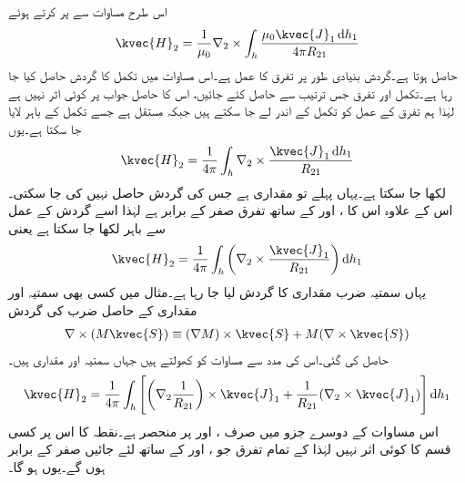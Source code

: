 اس طرح مساوات  سے  پر کرتے ہوئے
\begin{align*}
\kvec{H}_2=\frac{1}{\mu_0} \nabla_2 \times \int_h \frac{\mu_0 \kvec{J}_1 \dif h_1}{4\pi R_{21}}
\end{align*}
حاصل ہوتا ہے۔گردش  بنیادی طور پر تفرق کا عمل ہے۔اس مساوات میں تکمل کا گردش حاصل کیا جا رہا ہے۔تکمل اور تفرق جس ترتیب سے حاصل کئے جائیں، اس کا حاصل جواب پر کوئی اثر نہیں ہے لہٰذا ہم تفرق کے عمل کو تکمل کے اندر لے جا سکتے ہیں جبکہ  مستقل ہے جسے تکمل کے باہر لایا جا سکتا ہے۔یوں
\begin{align*}
\kvec{H}_2=\frac{1}{4\pi}  \int_h \nabla_2 \times\frac{ \kvec{J}_1 \dif h_1}{ R_{21}}
\end{align*}
لکھا جا سکتا ہے۔یہاں  پہلے تو مقداری ہے جس کی گردش حاصل نہیں کی جا سکتی۔ اس کے علاوہ اس کا ،  اور  کے ساتھ تفرق صفر کے برابر ہے لہٰذا اسے گردش کے عمل سے  باہر لکھا جا سکتا ہے یعنی
\begin{align}\label{مساوات_مقناطیسی_گردش_ثبوت_الف}
\kvec{H}_2=\frac{1}{4\pi}  \int_h \left(\nabla_2 \times\frac{ \kvec{J}_1}{ R_{21}}\right) \dif h_1
\end{align}
یہاں سمتیہ  ضرب مقداری  کا گردش لیا جا رہا ہے۔مثال  میں کسی بھی سمتیہ  اور مقداری  کے حاصل ضرب کی گردش
\begin{align}
\nabla \times (M \kvec{S}) \equiv (\nabla M) \times \kvec{S} +M(\nabla \times \kvec{S})
\end{align}
حاصل کی گئی۔اس کی مدد سے مساوات  کو کھولتے ہیں جہاں سمتیہ  اور مقداری  ہیں۔
\begin{align}\label{مساوات_مقناطیسی_گردش_ثبوت_ب}
\kvec{H}_2=\frac{1}{4\pi}  \int_h  \left[ \left(\nabla_2 \frac{1}{R_{21}}\right) \times \kvec{J}_1 +\frac{1}{R_{21}} (\nabla_2 \times \kvec{J}_1) \right]\dif h_1
\end{align}
اس مساوات کے دوسرے جزو میں  صرف ،  اور  پر منحصر ہے۔نقطہ  کا اس پر کسی قسم  کا کوئی اثر نہیں لہٰذا  کے تمام تفرق جو ،  اور  کے ساتھ لئے جائیں صفر کے برابر ہوں گے۔یوں  ہو گا۔

